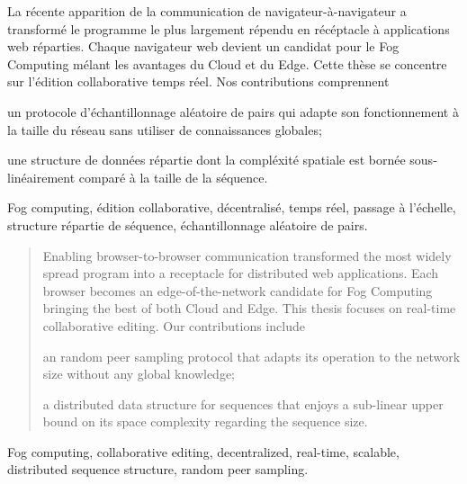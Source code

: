 
\begin{resume}
  La récente apparition de la communication de navigateur-à-navigateur a
  transformé le programme le plus largement répendu en récéptacle à applications
  web réparties. Chaque navigateur web devient un candidat pour le Fog Computing
  mélant les avantages du Cloud et du Edge. Cette thèse se concentre sur
  l'édition collaborative temps réel. Nos contributions comprennent
  \begin{inparaenum}[(i)]
  \item un protocole d'échantillonnage aléatoire de pairs qui adapte son
    fonctionnement à la taille du réseau sans utiliser de connaissances
    globales;
  \item une structure de données répartie dont la compléxité spatiale est bornée
    sous-linéairement comparé à la taille de la séquence.
  \end{inparaenum}
\end{resume}

\begin{motscles}
  Fog computing, édition collaborative, décentralisé, temps réel, passage à
  l'échelle, structure répartie de séquence, échantillonnage aléatoire de pairs.
\end{motscles}

\begin{abstract}
  Enabling browser-to-browser communication transformed the most widely spread
  program into a receptacle for distributed web applications. Each browser
  becomes an edge-of-the-network candidate for Fog Computing bringing the best
  of both Cloud and Edge. This thesis focuses on real-time collaborative editing. Our
  contributions include
  \begin{inparaenum}[(i)]
  \item an random peer sampling protocol that adapts its operation to the
    network size without any global knowledge;
  \item a distributed data structure for sequences that enjoys a sub-linear
    upper bound on its space complexity regarding the sequence size.
  \end{inparaenum}
\end{abstract}

\begin{keywords}
  Fog computing, collaborative editing, decentralized, real-time, scalable,
  distributed sequence structure, random peer sampling.
\end{keywords}

